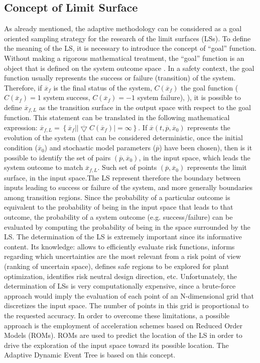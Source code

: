 \subsection{Concept of Limit Surface } 
\label{sec:LimitS}
 As already mentioned, the adaptive methodology can be considered as a goal oriented sampling strategy for the research of the limit surfaces (LSs). To define the meaning of the LS, it is necessary to introduce the concept of “goal” function. Without making a rigorous mathematical treatment, the “goal” function is an object that is defined on the system outcome space . In a safety context, the goal function usually represents the success or failure (transition) of the system. Therefore, if $\overline{x}_{f}$ is the final status of the system, $C\left (\overline{x}_{f}\right )$ the goal function ( $C\left (\overline{x}_{f}\right ) = 1$ system success,  $C\left (\overline{x}_{f}\right ) = -1$ system failure), ), it is possible to define $\overline{x}_{f,L}$ as the transition surface in the output space with respect to the goal function. This statement can be translated in the following mathematical expression: $\overline{x}_{f,L} = \left \{ \overline{x}_{f}|\left | \overline{\bigtriangledown} C\left ( \overline{x}_{f} \right ) \right |= \infty \right \}$. If $\overline{x}\left (t,\overline{p},\overline{x}_{0}  \right )$ represents the evolution of the system (that can be considered deterministic, once the initial condition ($\overline{x}_{0} $) and stochastic model parameters ($\overline{p}$) have been chosen), then is it possible to identify the set of pairs $\left ( \overline{p},\overline{x}_{0} \right )$, in the input space, which leads the system outcome to match $\overline{x}_{f,L}$. Such set of points $\left ( \overline{p},\overline{x}_{0} \right )$ represents the limit surface, in the input space.The LS represent therefore the boundary between inputs leading to success or failure of the system, and more generally boundaries among transition regions.
Since the probability of a particular outcome is equivalent to the probability of being in the input space that leads to that outcome, the probability of a system outcome (e.g. success/failure) can be evaluated by computing the probability of being in the space surrounded by the LS.
The determination of the LS is extremely important since its informative content.  Its knowledge: allows to efficiently evaluate risk functions, informs regarding which uncertainties are the most relevant from a risk point of view (ranking of uncertain space), defines safe regions to be explored for plant optimization, identifies risk neutral design direction, etc. Unfortunately, the determination of LSs is very computationally expensive, since a brute-force approach would imply the evaluation of each point of an N-dimensional grid that discretizes the input space. The number of points in this grid is proportional to the requested accuracy. In order to overcome these limitations, a possible approach is the employment of acceleration schemes based on Reduced Order Models (ROMs). ROMs are used to predict the location of the LS in order to drive the exploration of the input space toward its possible location. The Adaptive Dynamic Event Tree is based on this concept.
